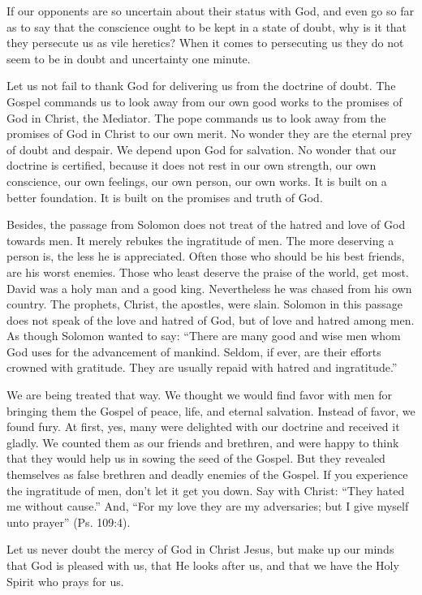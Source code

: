 If our opponents are so uncertain about their status with God, and even go so far as to say that the conscience ought to be kept in a state of doubt, why is it that they persecute us as vile heretics? When it comes to persecuting us they do not seem to be in doubt and uncertainty one minute.

Let us not fail to thank God for delivering us from the doctrine of doubt. The Gospel commands us to look away from our own good works to the promises of God in Christ, the Mediator. The pope commands us to look away from the promises of God in Christ to our own merit. No wonder they are the eternal prey of doubt and despair. We depend upon God for salvation. No wonder that our doctrine is certified, because it does not rest in our own strength, our own conscience, our own feelings, our own person, our own works. It is built on a better foundation. It is built on the promises and truth of God.

Besides, the passage from Solomon does not treat of the hatred and love of God towards men. It merely rebukes the ingratitude of men. The more deserving a person is, the less he is appreciated. Often those who should be his best friends, are his worst enemies. Those who least deserve the praise of the world, get most. David was a holy man and a good king. Nevertheless he was chased from his own country. The prophets, Christ, the apostles, were slain. Solomon in this passage does not speak of the love and hatred of God, but of love and hatred among men. As though Solomon wanted to say: “There are many good and wise men whom God uses for the advancement of mankind. Seldom, if ever, are their efforts crowned with gratitude. They are usually repaid with hatred and ingratitude.”

We are being treated that way. We thought we would find favor with men for bringing them the Gospel of peace, life, and eternal salvation. Instead of favor, we found fury. At first, yes, many were delighted with our doctrine and received it gladly. We counted them as our friends and brethren, and were happy to think that they would help us in sowing the seed of the Gospel. But they revealed themselves as false brethren and deadly enemies of the Gospel. If you experience the ingratitude of men, don’t let it get you down. Say with Christ: “They hated me without cause.” And, “For my love they are my adversaries; but I give myself unto prayer” (Ps. 109:4).

Let us never doubt the mercy of God in Christ Jesus, but make up our minds that God is pleased with us, that He looks after us, and that we have the Holy Spirit who prays for us.

